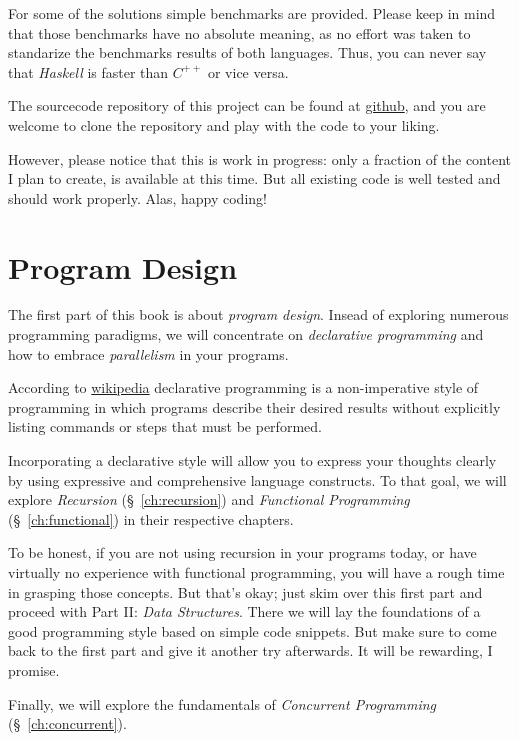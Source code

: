 \documentclass{scrbook}
\numberwithin{equation}{chapter}
\theoremstyle{definition}
\begin{document}
For some of the solutions simple benchmarks are provided.
Please keep in mind that those benchmarks have no absolute meaning, as no effort
was taken to standarize the benchmarks results of both languages.
Thus, you can never say that \emph{Haskell} is faster than $C^{++}$ or vice versa.

The sourcecode repository of this project can be found at
\href{https://github.com/okrischer/mastering}{github}, and you are welcome to clone
the repository and play with the code to your liking.

However, please notice that this is work in progress: only a fraction of the content
I plan to create, is available at this time. But all existing code is well tested and
should work properly. Alas, happy coding!

\mainmatter
\part{Program Design}
The first part of this book is about \emph{program design}.
Insead of exploring numerous programming paradigms, we will concentrate on
\emph{declarative programming} and how to embrace \emph{parallelism} in your programs.

According to
\href{https://en.wikipedia.org/wiki/Declarative_programming}{wikipedia} declarative programming
is a non-imperative style of programming in which programs describe their desired
results without explicitly listing commands or steps that must be performed.

Incorporating a declarative style will allow you to express your thoughts clearly by using
expressive and comprehensive language constructs.
To that goal, we will explore \emph{Recursion} (§~\ref{ch:recursion}) and
\emph{Functional Programming} (§~\ref{ch:functional}) in their respective chapters.

To be honest, if you are not using recursion in your programs today, or have virtually no
experience with functional programming, you will have a rough time in grasping those concepts.
But that's okay; just skim over this first part and proceed with Part II: \emph{Data Structures}.
There we will lay the foundations of a good programming style based on simple code snippets.
But make sure to come back to the first part and give it another try afterwards.
It will be rewarding, I promise.

Finally, we will explore the fundamentals of \emph{Concurrent Programming}
(§~\ref{ch:concurrent}).




\end{document}
